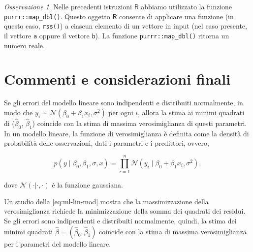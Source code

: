\documentclass[
  11pt,
]{krantz}
\newcommand{\R}{\textsf{R}} %
\theoremstyle{definition}
\theoremstyle{definition}
\theoremstyle{definition}
\theoremstyle{definition}
\theoremstyle{remark}
\newtheorem*{remark}{Osservazione}
\begin{document}
\begin{remark}
Nelle precedenti istruzioni \(\R\) abbiamo utilizzato la funzione \texttt{purrr::map\_dbl()}. Questo oggetto \(\R\) consente di applicare una funzione (in questo caso, \texttt{rss()}) a ciascun elemento di un vettore in input (nel caso presente, il vettore \texttt{a} oppure il vettore \texttt{b}). La funzione \texttt{purrr::map\_dbl()} ritorna un numero reale.
\end{remark}

\hypertarget{commenti-e-considerazioni-finali-3}{%
\section*{Commenti e considerazioni finali}\label{commenti-e-considerazioni-finali-3}}


Se gli errori del modello lineare sono indipendenti e distribuiti normalmente, in modo che \(y_i \sim \mathcal{N}(\beta_0 + \beta_1 x_i, \sigma^2)\) per ogni \(i\), allora la stima ai minimi quadrati di (\(\hat{\beta}_0\), \(\hat{\beta}_1\)) coincide con la stima di massima verosimiglianza di questi parametri. In un modello lineare, la funzione di verosimiglianza è definita come la densità di probabilità delle osservazioni, dati i parametri e i predittori, ovvero,

\begin{equation}
 p(y \mid \beta_0, \beta_1, \sigma, x) = \prod_{i=1}^n \mathcal{N}(y_i \mid \beta_0 + \beta_1 x_i, \sigma^2),
 \label{eq:ml-lin-mod}
\end{equation}

dove \(\mathcal{N}(\cdot | \cdot, \cdot)\) è la funzione gaussiana.

Un studio della \eqref{eq:ml-lin-mod} mostra che la massimizzazione della verosimiglianza richiede la minimizzazione della somma dei quadrati dei residui. Se gli errori sono indipendenti e distribuiti normalmente, quindi, la stima dei minimi quadrati \(\hat{\beta} = (\hat{\beta}_0, \hat{\beta}_1)\) coincide con la stima di massima verosimiglianza per i parametri del modello lineare.

  

\printindex
\end{document}

